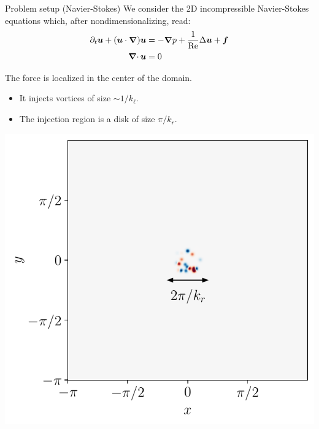 \documentclass{beamer} %
\begin{document}
\begin{frame}{Problem setup (Navier-Stokes)}
	We consider the \textcolor{\mycolorhighlight}{2D incompressible Navier-Stokes equations} which, after nondimensionalizing, read:
	\begin{align*}
		\partial_t \boldsymbol{u} + (\boldsymbol{u} \cdot \grad) \boldsymbol{u} & = -\grad p + \frac{1}{\text{Re}} \Delta \boldsymbol{u} + \boldsymbol{f} \\
		\operatorname{\boldsymbol{\nabla}\cdot} \boldsymbol{u}                                    & = 0
	\end{align*}
	\vspace{-0.8cm}

	\begin{minipage}{0.44\textwidth}
		The force is localized in the center of the domain.

		\begin{itemize}
			\item It injects vortices of size $\sim 1/k_\ell$.
			\item The injection region is a disk of size $\pi/k_r$.
		\end{itemize}
	\end{minipage}\hspace{0.04\textwidth}
	\begin{minipage}{0.44\textwidth}
		\centering
		\includegraphics[width=\textwidth]{../images/FlowD_fw.001_arrow.pdf}
	\end{minipage}
\end{frame}
\end{document}
